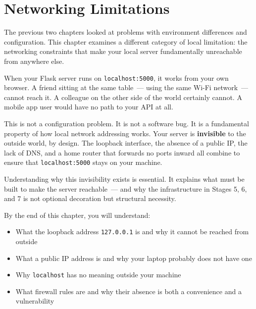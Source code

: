 \setcounter{chapter}{9}
\chapter{Networking Limitations}\label{ch:10-networking-limitations}

\chapterrule

The previous two chapters looked at problems with environment differences and configuration. This chapter examines a different category of local limitation: the networking constraints that make your local server fundamentally unreachable from anywhere else.

When your Flask server runs on \texttt{localhost:5000}, it works from your own browser. A friend sitting at the same table~--- using the same Wi-Fi network~--- cannot reach it. A colleague on the other side of the world certainly cannot. A mobile app user would have no path to your API at all.

This is not a configuration problem. It is not a software bug. It is a fundamental property of how local network addressing works. Your server is \textbf{invisible} to the outside world, by design. The loopback interface, the absence of a public IP, the lack of DNS, and a home router that forwards no ports inward all combine to ensure that \texttt{localhost:5000} stays on your machine.

Understanding why this invisibility exists is essential. It explains what must be built to make the server reachable~--- and why the infrastructure in Stages 5, 6, and 7 is not optional decoration but structural necessity.

\begin{objectives}

By the end of this chapter, you will understand:

\begin{itemize}
\tightlist
\item
  What the loopback address \texttt{127.0.0.1} is and why it cannot be reached from outside
\item
  What a public IP address is and why your laptop probably does not have one
\item
  Why \texttt{localhost} has no meaning outside your machine
\item
  What firewall rules are and why their absence is both a convenience and a vulnerability
\end{itemize}

\end{objectives}

